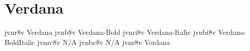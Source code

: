 \documentclass[sample]{vnsample}
\begin{document}
\section{Verdana}
  {jvnr8v}  {Verdana}
  {jvnb8v}  {Verdana-Bold}
 {jvnri8v} {Verdana-Italic}
 {jvnbi8v} {Verdana-BoldItalic}
 {jvnrc8v} {N/A}
 {jvnbc8v} {N/A}
  {jvnr8v}  {Verdana}
\end{document}
